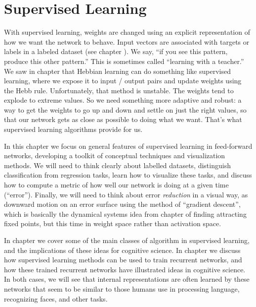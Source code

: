 \chapter{Supervised Learning}\label{ch_supervised}

With supervised learning, weights are changed using an explicit representation of how we want the network to behave. Input vectors are associated with targets or labels in a labeled dataset (see chapter ). We say, ``if you see this pattern, produce this other pattern.''  This is sometimes called ``learning with a teacher.''  We saw in chapter  that Hebbian learning can do something like supervised learning, where we expose it to input / output pairs and update weights using the Hebb rule. Unfortunately, that method is unstable. The weights tend to explode to extreme values. So we need something more adaptive and robust: a way to get the weights to go up and down and settle on just the right values, so that our network gets as close as possible to doing what we want. That's what supervised learning algorithms provide for us.

In this chapter we focus on general features of supervised learning in feed-forward networks, developing a toolkit of conceptual techniques and visualization methods. We will need to think clearly about labelled datasets, distinguish classification from regression tasks, learn how to visualize these tasks, and discuss how to compute a metric of how well our network is doing at a given time (``error''). Finally, we will need to think about error \emph{reduction} in a visual way, as downward motion on an error surface using the method of ``gradient descent'', which is basically the dynamical systems idea from chapter  of finding attracting fixed points, but this time in weight space rather than activation space. 

In chapter  we cover some of the main classes of algorithm in supervised learning, and the implications of these ideas for cognitive science. In chapter  we discuss how supervised learning methods can be used to train recurrent networks, and how these trained recurrent networks have illustrated ideas in cognitive science. In both cases, we will see that internal representations are often learned by these networks that seem to be similar to those humans use in processing language, recognizing faces, and other tasks. 

